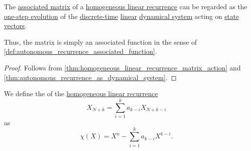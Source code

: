 \begin{corollary}\label{thm:homogeneous_linear_recurrence_as_dynamical_system}
  The \hyperref[def:homogeneous_linear_recurrence_matrix]{associated matrix} of a \hyperref[def:homogeneous_linear_recurrence]{homogeneous linear recurrence} can be regarded as the \hyperref[def:one_step_evolution_function]{one-step evolution} of the \hyperref[def:discrete_dynamical_system]{discrete-time} \hyperref[def:linear_dynamical_system]{linear} \hyperref[def:dynamical_system]{dynamical system} acting on \hyperref[def:recurrence_relation/state]{state vectors}.
\end{corollary}
\begin{comments}
  \item Thus, the matrix is simply an associated function in the sense of \cref{def:autonomous_recurrence_associated_function}.
\end{comments}
\begin{proof}
  Follows from \cref{thm:homogeneous_linear_recurrence_matrix_action} and \cref{thm:autonomous_recurrence_as_dynamical_system}.
\end{proof}

\begin{definition}\label{def:linear_recurrence_characteristic_polynomial}
  We define the  of the \hyperref[def:homogeneous_linear_recurrence]{homogeneous linear recurrence}
  \begin{equation*}
    X_{N+k} = \sum_{i=1}^k a_{k-i} X_{N+k-i}
  \end{equation*}
  as
  \begin{equation}\label{eq:def:linear_recurrence_characteristic_polynomial}
    \chi(X) = X^n - \sum_{i=1}^k a_{k-i} X^{k-i}.
  \end{equation}
\end{definition}

